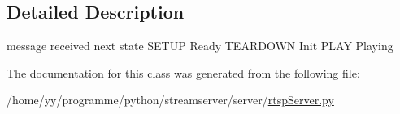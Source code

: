 \subsection{Detailed Description}
\begin{DoxyVerb}message received    next state
        SETUP               Ready
        TEARDOWN            Init
        PLAY                Playing\end{DoxyVerb}
 

The documentation for this class was generated from the following file:\begin{DoxyCompactItemize}
\item 
/home/yy/programme/python/streamserver/server/\hyperlink{rtspServer_8py}{rtspServer.py}\end{DoxyCompactItemize}

